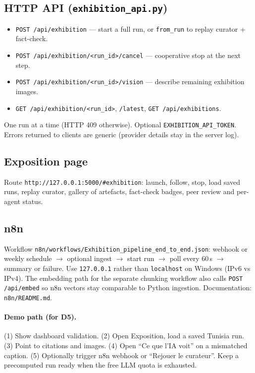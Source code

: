 \documentclass[11pt,a4paper]{article}
\begin{document}
\subsection{HTTP API (\texttt{exhibition\_api.py})}
\begin{itemize}
  \item \texttt{POST /api/exhibition} --- start a full run, or \texttt{from\_run} to replay curator + fact-check.
  \item \texttt{POST /api/exhibition/<run\_id>/cancel} --- cooperative stop at the next step.
  \item \texttt{POST /api/exhibition/<run\_id>/vision} --- describe remaining exhibition images.
  \item \texttt{GET /api/exhibition/<run\_id>}, \texttt{/latest}, \texttt{GET /api/exhibitions}.
\end{itemize}
One run at a time (HTTP 409 otherwise). Optional \texttt{EXHIBITION\_API\_TOKEN}. Errors returned to clients are generic (provider details stay in the server log).

\subsection{Exposition page}
Route \texttt{http://127.0.0.1:5000/\#exhibition}: launch, follow, stop, load saved runs, replay curator, gallery of artefacts, fact-check badges, peer review and per-agent status.

\subsection{n8n}
Workflow \texttt{n8n/workflows/Exhibition\_pipeline\_end\_to\_end.json}: webhook or weekly schedule $\rightarrow$ optional ingest $\rightarrow$ start run $\rightarrow$ poll every 60\,s $\rightarrow$ summary or failure. Use \texttt{127.0.0.1} rather than \texttt{localhost} on Windows (IPv6 vs IPv4). The embedding path for the separate chunking workflow also calls \texttt{POST /api/embed} so n8n vectors stay comparable to Python ingestion. Documentation: \texttt{n8n/README.md}.

\paragraph{Demo path (for D5).}
(1) Show dashboard validation. (2) Open Exposition, load a saved Tunisia run. (3) Point to citations and images. (4) Open ``Ce que l'IA voit'' on a mismatched caption. (5) Optionally trigger n8n webhook or ``Rejouer le curateur''. Keep a precomputed run ready when the free LLM quota is exhausted.
\end{document}

